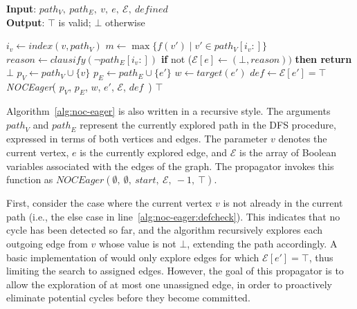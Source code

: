 \documentclass[letterpaper]{article} %
\begin{document}
\begin{algorithm}
\small
\caption{\textbf{\textit{NOCEager}}}
\textbf{Input}: $path_V,\ path_E,\ v,\ e,\ \mathcal{E},\ \textit{defined}$ \\
\textbf{Output}: $\top$ is valid; $\bot$ otherwise
\begin{algorithmic}[1]
     \label{alg:noc-eager:pathcheck}
        \STATE $i_v \gets \textit{index}(v, path_V)$
        \STATE $m \gets \max\{f(v') \mid v' \in path_V[i_v:]\}$
         \label{alg:noc-eager:checkopponent}
            \STATE $\textit{reason} \gets \textit{clausify}(\neg path_E[i_v:])$ \label{alg:noc-eager:reason}
            \STATE \textbf{if }not ($\mathcal{E}[e] \gets (\bot, \textit{reason}))$ \textbf{then return $\bot$}
        \ENDIF
     \label{alg:noc-eager:defcheck}
         \label{alg:no-opponent-cycle-f1:edgecheck}
            \STATE $p_V \gets path_V \cup \{v\}$
            \STATE $p_E \gets path_E \cup \{e'\}$
            \STATE $w \gets \textit{target}(e')$
            \STATE $\textit{def} \gets \mathcal{E}[e'] = \top$
            \STATE \textit{NOCEager}(
                $p_V$,
                $p_E$,
                $w$,
                $e'$,
                $\mathcal{E}$,
                $\textit{def}$\ )
        \ENDFOR
    \ENDIF
    \RETURN $\top$
\end{algorithmic}
\label{alg:noc-eager}
\end{algorithm}

Algorithm~\ref{alg:noc-eager} is also written in a recursive style. The arguments $\mathit{path}_V$ and $\mathit{path}_E$ represent the currently explored path in the DFS procedure, expressed in terms of both vertices and edges. The parameter $v$ denotes the current vertex, $e$ is the currently explored edge, and $\mathcal{E}$ is the array of Boolean variables associated with the edges of the graph. The \noc propagator invokes this function as $\textit{NOCEager}(\emptyset,\ \emptyset,\ start,\ \mathcal{E},\ -1,\ \top)$.

First, consider the case where the current vertex $v$ is not already in the current path (i.e., the else case in line~\ref{alg:noc-eager:defcheck}). This indicates that no cycle has been detected so far, and the algorithm recursively explores each outgoing edge from $v$ whose value is not $\bot$, extending the path accordingly. A basic implementation of \noceager would only explore edges for which $\mathcal{E}[e'] = \top$, thus limiting the search to assigned edges. However, the goal of this propagator is to allow the exploration of at most one unassigned edge, in order to proactively eliminate potential cycles before they become committed.
\end{document}
